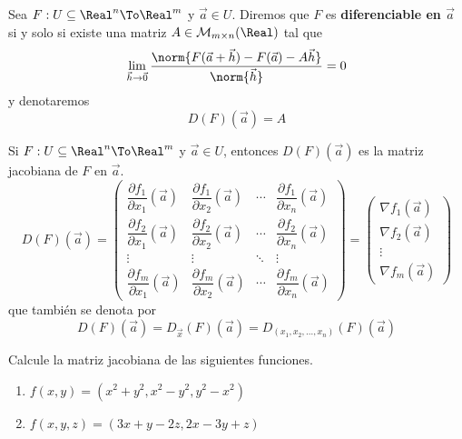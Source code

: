 \begin{frame}
  \begin{defn}
    Sea $F:U\subseteq\Real^n\To\Real^m$ y $\vec{a}\in U$. Diremos que $F$ es \textbf{diferenciable en $\vec{a}$} si y solo si existe una matriz $A\in\mathcal{M}_{m\times n}(\Real)$ tal que
    $$\lim_{\vec{h}\to\vec{0}}\dfrac{\norm{F(\vec{a}+\vec{h})-F(\vec{a})-A\vec{h}}}{\norm{\vec{h}}}=0$$
    y denotaremos
    $$D(F)(\vec{a})=A$$
  \end{defn}
\end{frame}

\begin{frame}
  \begin{rem}
    Si $F:U\subseteq\Real^n\To\Real^m$ y $\vec{a}\in U$, entonces $D(F)(\vec{a})$ es la matriz jacobiana de $F$ en $\vec{a}$.
    $$D(F)(\vec{a})=\begin{pmatrix}
      \dfrac{\partial f_1}{\partial x_1}(\vec{a}) & \dfrac{\partial f_1}{\partial x_2}(\vec{a}) & \cdots & \dfrac{\partial f_1}{\partial x_n}(\vec{a})\\
      \dfrac{\partial f_2}{\partial x_1}(\vec{a}) & \dfrac{\partial f_2}{\partial x_2}(\vec{a}) & \cdots & \dfrac{\partial f_2}{\partial x_n}(\vec{a})\\
      \vdots & \vdots & \ddots & \vdots\\
      \dfrac{\partial f_m}{\partial x_1}(\vec{a}) & \dfrac{\partial f_m}{\partial x_2}(\vec{a}) & \cdots & \dfrac{\partial f_m}{\partial x_n}(\vec{a})\end{pmatrix}=
      \begin{pmatrix}
        \nabla f_1(\vec{a})\\
        \nabla f_2(\vec{a})\\
        \vdots\\
        \nabla f_m(\vec{a})
      \end{pmatrix}
    $$
    que también se denota por
    $$D(F)(\vec{a})=D_{\vec{x}}(F)(\vec{a})=D_{(x_1,x_2,\ldots,x_n)}(F)(\vec{a})$$
  \end{rem}
\end{frame}

\begin{frame}
  \begin{egs}
    Calcule la matriz jacobiana de las siguientes funciones.
    \begin{enumerate}[<+->]
      \item $\displaystyle f(x,y)=\left(x^2+y^2,x^2-y^2,y^2-x^2\right)$\\[0.25cm]
      \item $\displaystyle f(x,y,z)=\left(3x+y-2z,2x-3y+z\right)$\\[0.25cm]
    \end{enumerate}
  \end{egs}
\end{frame}

